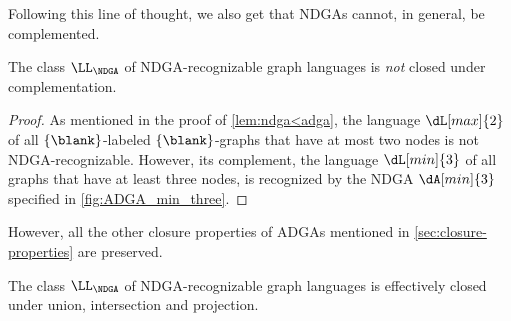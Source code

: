 \documentclass[a4paper,11pt,twoside]{report} \pdfoutput=1
\begin{document}
Following this line of thought, we also get that NDGAs cannot, in
general, be complemented.

\begin{lemma}[Complementation] \label{lem:ndga-complementation}
  The class $\LL_\NDGA$ of NDGA-recognizable graph languages is
  \emph{not} closed under complementation.
\end{lemma}

\begin{proof}
  As mentioned in the proof of \cref{lem:ndga<adga}, the language
  $\dL[max]{2}$ of all $\{\blank\}$-labeled $\{\blank\}$-graphs that
  have at most two nodes is not NDGA-recognizable. However, its
  complement, the language $\dL[min]{3}$ of all graphs that have at
  least three nodes, is recognized by the NDGA $\dA[min]{3}$ specified
  in \cref{fig:ADGA_min_three}.
\end{proof}

However, all the other closure properties of ADGAs mentioned in
\cref{sec:closure-properties} are preserved.

\begin{lemma} \label{lem:ndga-closure}
  The class $\LL_\NDGA$ of NDGA-recognizable graph languages is
  effectively closed under union, intersection and projection.
\end{lemma}
\end{document}
